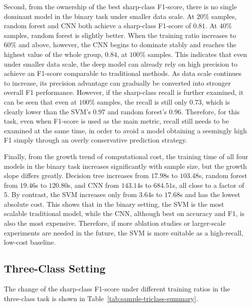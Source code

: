 \par Second, from the ownership of the best sharp-class F1-score, there is no
single dominant model in the binary task under smaller data scale. At $20\%$
samples, random forest and CNN both achieve a sharp-class F1-score of $0.81$.
At $40\%$ samples, random forest is slightly better. When the training ratio
increases to $60\%$ and above, however, the CNN begins to dominate stably and
reaches the highest value of the whole group, $0.84$, at $100\%$ samples. This
indicates that even under smaller data scale, the deep model can already rely
on high precision to achieve an F1-score comparable to traditional methods. As
data scale continues to increase, its precision advantage can gradually be
converted into stronger overall F1 performance. However, if the sharp-class
recall is further examined, it can be seen that even at $100\%$ samples, the
recall is still only $0.73$, which is clearly lower than the SVM's $0.97$ and
random forest's $0.96$. Therefore, for this task, even when F1-score is used
as the main metric, recall still needs to be examined at the same time, in
order to avoid a model obtaining a seemingly high F1 simply through an overly
conservative prediction strategy.

\par Finally, from the growth trend of computational cost, the training time of
all four models in the binary task increases significantly with sample size,
but the growth slope differs greatly. Decision tree increases from $17.98$s to
$103.48$s, random forest from $19.46$s to $120.80$s, and CNN from $143.14$s
to $684.51$s, all close to a factor of $5$. By contrast, the SVM increases
only from $3.64$s to $17.68$s and has the lowest absolute cost. This shows
that in the binary setting, the SVM is the most scalable traditional model,
while the CNN, although best on accuracy and F1, is also the most expensive.
Therefore, if more ablation studies or larger-scale experiments are needed in
the future, the SVM is more suitable as a high-recall, low-cost baseline.

\subsection{Three-Class Setting}
\par The change of the sharp-class F1-score under different training ratios in
the three-class task is shown in
Table~\ref{tab:sample-triclass-summary}.

